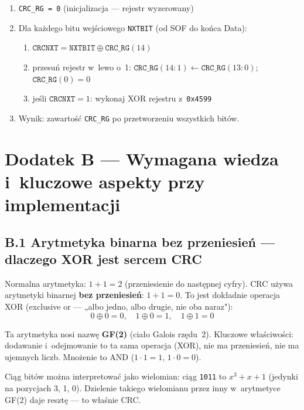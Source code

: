 \documentclass[12pt,a4paper]{article}
\begin{document}
\begin{enumerate}
    \item \texttt{CRC\_RG = 0} (inicjalizacja — rejestr wyzerowany)
    \item Dla każdego bitu wejściowego \texttt{NXTBIT} (od SOF do końca Data):
    \begin{enumerate}[label=\alph*)]
        \item $\texttt{CRCNXT} = \texttt{NXTBIT} \oplus \texttt{CRC\_RG}(14)$
        \item przesuń rejestr w~lewo o~1:
              $\texttt{CRC\_RG}(14:1) \leftarrow \texttt{CRC\_RG}(13:0)$;
              $\texttt{CRC\_RG}(0) = 0$
        \item jeśli $\texttt{CRCNXT} = 1$: wykonaj XOR rejestru z~\texttt{0x4599}
    \end{enumerate}
    \item Wynik: zawartość \texttt{CRC\_RG} po przetworzeniu wszystkich bitów.
\end{enumerate}


\section*{Dodatek B — Wymagana wiedza i~kluczowe aspekty przy implementacji}

\subsection*{B.1 Arytmetyka binarna bez przeniesień — dlaczego XOR jest sercem CRC}

Normalna arytmetyka: $1 + 1 = 2$ (przeniesienie do następnej cyfry).
CRC używa arytmetyki binarnej \textbf{bez przeniesień}: $1 + 1 = 0$.
To jest dokładnie operacja XOR (exclusive or — „albo jedno, albo drugie,
nie oba naraz"):
\[
0 \oplus 0 = 0,\quad 1 \oplus 0 = 1,\quad 1 \oplus 1 = 0
\]

Ta arytmetyka nosi nazwę \textbf{GF(2)} (ciało Galois rzędu~2).
Kluczowe właściwości: dodawanie i~odejmowanie to ta sama operacja (XOR),
nie ma przeniesień, nie ma ujemnych liczb. Mnożenie to AND ($1 \cdot 1 = 1$,
$1 \cdot 0 = 0$).

Ciąg bitów można interpretować jako wielomian: ciąg \texttt{1011} to
$x^3 + x + 1$ (jedynki na pozycjach 3, 1, 0). Dzielenie takiego wielomianu
przez inny w~arytmetyce GF(2) daje resztę — to właśnie CRC.
\end{document}
